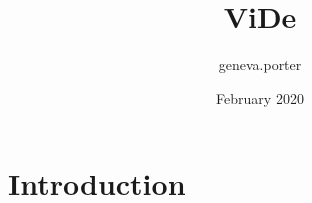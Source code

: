 \documentclass{article}
\title{ViDe}
\author{geneva.porter }
\date{February 2020}
\begin{document}
\maketitle

\section{Introduction}
\end{document}
